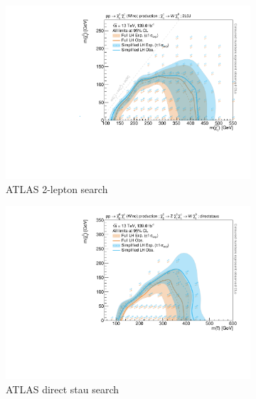 \begin{figure}
\begin{subfigure}[b]{0.5\textwidth}
		\centering\includegraphics[width=\textwidth]{exclusion_2L0J_CLs_noLabel}
		\caption{ATLAS 2-lepton search~\cite{SUSY-2018-32}\label{fig:results_2L0J_CLs}}
	\end{subfigure}\hfill
	\begin{subfigure}[b]{0.5\textwidth}
		\centering\includegraphics[width=\textwidth]{exclusion_directstaus_CLs_noLabel}
		\caption{ATLAS direct stau search~\cite{SUSY-2018-04}\label{fig:results_directstaus_CLs}}
	\end{subfigure}\hfill
	\begin{subfigure}[b]{0.5\textwidth}

\end{subfigure}
\end{figure}
